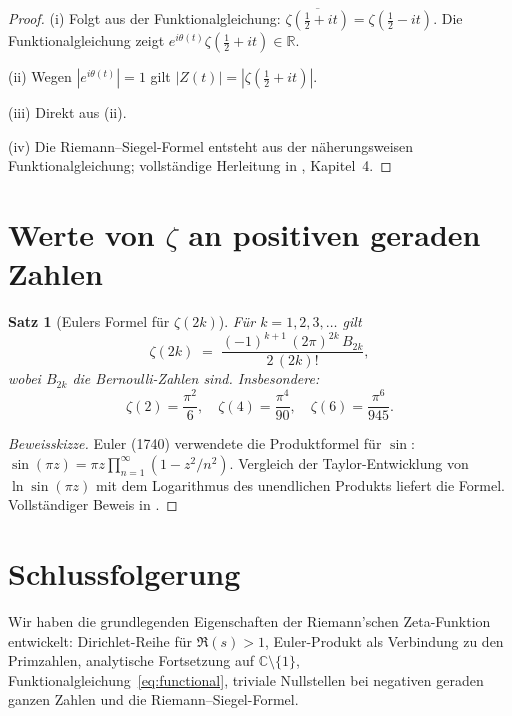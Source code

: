 \documentclass[12pt,a4paper]{amsart}
\newtheorem{theorem}{Satz}[section]
\theoremstyle{definition}
\newcommand{\R}{\mathbb{R}}
\newcommand{\C}{\mathbb{C}}
\begin{document}
\begin{proof}
(i) Folgt aus der Funktionalgleichung:
$\overline{\zeta(\tfrac{1}{2}+it)} = \zeta(\tfrac{1}{2}-it)$.
Die Funktionalgleichung zeigt $e^{i\theta(t)}\zeta(\tfrac{1}{2}+it) \in \R$.

(ii) Wegen $|e^{i\theta(t)}| = 1$ gilt $|Z(t)| = |\zeta(\tfrac{1}{2}+it)|$.

(iii) Direkt aus (ii).

(iv) Die Riemann--Siegel-Formel entsteht aus der n\"aherungsweisen
Funktionalgleichung; vollst\"andige Herleitung in \cite{Titchmarsh1986},
Kapitel~4.
\end{proof}

\section{Werte von \texorpdfstring{$\zeta$}{zeta} an positiven geraden Zahlen}

\begin{theorem}[Eulers Formel f\"ur $\zeta(2k)$]
\label{thm:euler_values}
F\"ur $k = 1, 2, 3, \ldots$ gilt
\[
  \zeta(2k) \;=\; \frac{(-1)^{k+1}\,(2\pi)^{2k}\,B_{2k}}{2\,(2k)!},
\]
wobei $B_{2k}$ die Bernoulli-Zahlen sind. Insbesondere:
\[
  \zeta(2) = \frac{\pi^2}{6}, \quad
  \zeta(4) = \frac{\pi^4}{90}, \quad
  \zeta(6) = \frac{\pi^6}{945}.
\]
\end{theorem}

\begin{proof}[Beweisskizze]
Euler (1740) verwendete die Produktformel f\"ur $\sin$:
$\sin(\pi z) = \pi z \prod_{n=1}^{\infty}(1 - z^2/n^2)$.
Vergleich der Taylor-Entwicklung von $\ln\sin(\pi z)$ mit dem Logarithmus
des unendlichen Produkts liefert die Formel.
Vollst\"andiger Beweis in \cite{Apostol1976}.
\end{proof}

\section{Schlussfolgerung}

Wir haben die grundlegenden Eigenschaften der Riemann'schen Zeta-Funktion
entwickelt: Dirichlet-Reihe f\"ur $\Re(s)>1$, Euler-Produkt als Verbindung
zu den Primzahlen, analytische Fortsetzung auf $\C\setminus\{1\}$,
Funktionalgleichung~\eqref{eq:functional}, triviale Nullstellen bei negativen
geraden ganzen Zahlen und die Riemann--Siegel-Formel.
\end{document}
